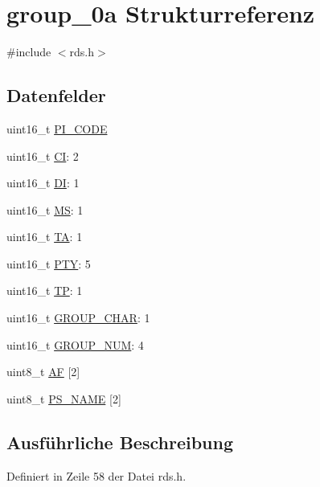 \hypertarget{structgroup__0a}{}\section{group\+\_\+0a Strukturreferenz}
\label{structgroup__0a}


{\ttfamily \#include $<$rds.\+h$>$}

\subsection*{Datenfelder}
\begin{DoxyCompactItemize}
\item 
uint16\+\_\+t \hyperlink{structgroup__0a_a5cd9b1f6413028425796c1129aa8fd87}{P\+I\+\_\+\+C\+O\+D\+E}
\item 
uint16\+\_\+t \hyperlink{structgroup__0a_aa6fd8556e02ce89fed23057f1cb37e44}{C\+I}\+: 2
\item 
uint16\+\_\+t \hyperlink{structgroup__0a_ad020d0abff338c9c34924a44478ac591}{D\+I}\+: 1
\item 
uint16\+\_\+t \hyperlink{structgroup__0a_a0d87191040df43fdd9f67487d0cc1a45}{M\+S}\+: 1
\item 
uint16\+\_\+t \hyperlink{structgroup__0a_a6de7751205cef4ffcce610399a030892}{T\+A}\+: 1
\item 
uint16\+\_\+t \hyperlink{structgroup__0a_a0474967478fbbc2c71b800d2e0132d45}{P\+T\+Y}\+: 5
\item 
uint16\+\_\+t \hyperlink{structgroup__0a_ab9e634c63b0d95a96716d5f6d7f06d72}{T\+P}\+: 1
\item 
uint16\+\_\+t \hyperlink{structgroup__0a_a66d4119990dc4c3e040a43885e9bb953}{G\+R\+O\+U\+P\+\_\+\+C\+H\+A\+R}\+: 1
\item 
uint16\+\_\+t \hyperlink{structgroup__0a_a9f692e9f76ee88348d426bcd4e9bc70b}{G\+R\+O\+U\+P\+\_\+\+N\+U\+M}\+: 4
\item 
uint8\+\_\+t \hyperlink{structgroup__0a_ae5a8515ae995b21e542b2ad52b20c34e}{A\+F} \mbox{[}2\mbox{]}
\item 
uint8\+\_\+t \hyperlink{structgroup__0a_a80447425671c19133df16d620705bb09}{P\+S\+\_\+\+N\+A\+M\+E} \mbox{[}2\mbox{]}
\end{DoxyCompactItemize}


\subsection{Ausführliche Beschreibung}


Definiert in Zeile 58 der Datei rds.\+h.



